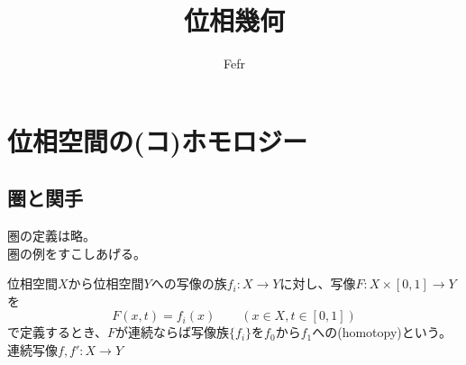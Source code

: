 \documentclass[dvipdfmx,a4paper,11pt]{jsarticle}
\begin{document}
\theoremstyle{plain}
\newtheorem{thm}{Theorem}[section]
\newtheorem{lem}[thm]{Lemma}
\newtheorem{prop}[thm]{Proposition}
\newtheorem{cor}[thm]{Corollary}
\newtheorem{conj}[thm]{Conjecture}

\theoremstyle{definition}
\newtheorem{ass}[thm]{Assumption}
\newtheorem{dfn}[thm]{Definition}

\theoremstyle{remark}
\newtheorem{rem}[thm]{Remark}

\theoremstyle{plain}
\newtheorem*{thm*}{Theorem}
\newtheorem*{lem*}{Lemma}
\newtheorem*{prop*}{Proposition}
\newtheorem*{cor*}{Corollary}
\newtheorem*{conj*}{Conjecture}

\theoremstyle{definition}
\newtheorem*{ass*}{Assumption}
\newtheorem*{dfn*}{Definition}

\theoremstyle{remark}
\newtheorem*{Proof}{Proof}


\theoremstyle{remark}
\newtheorem*{rem*}{Remark}

\title{位相幾何}
\date{}
\author{Fefr}
\maketitle
\tableofcontents


\section{位相空間の(コ)ホモロジー}

\subsection{圏と関手}

圏の定義は略。\\
圏の例をすこしあげる。
\begin{tcolorbox}[title = 例1]
  位相空間$X$から位相空間$Y$への写像の族$f_{i}:X\to Y$に対し、写像$F:X\times [0,1] \to Y$を
  \begin{equation*}
    F(x,t)=f_{i}(x)\qquad (x\in X,t \in [0,1])
  \end{equation*}
  で定義するとき、$F$が連続ならば写像族$\{f_i\}$を$f_0$から$f_1$への(homotopy)という。\\
  連続写像$f,f':X\to Y$
\end{tcolorbox}
\end{document}
